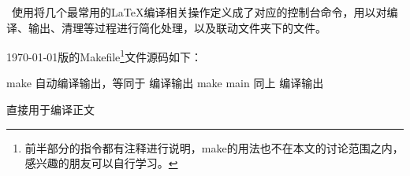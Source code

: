 \dk~使用将几个最常用的{\LaTeX}编译相关操作定义成了对应的控制台命令，用以对编译、输出、清理等过程进行简化处理，以及联动文件夹下的文件。

{\today}版的Makefile\footnote{前半部分的指令都有注释进行说明，make的用法也不在本文的讨论范围之内，感兴趣的朋友可以自行学习。}文件源码如下：


\begin{cvhonors}
  \cvhonor
  {make}
  {自动编译输出，等同于}
  {编译输出}
  \cvhonor
  {make main}
  {同上}
  {编译输出}
\end{cvhonors}

直接用于编译正文

\clearpage
